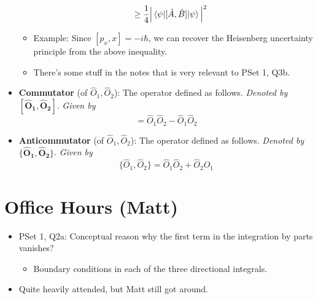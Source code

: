 \documentclass[../notes.tex]{subfiles}
\begin{document}
\begin{itemize}
\begin{itemize}
\begin{align*}
            &\geq \frac{1}{4}\Big| \ev{[\hat{A},\hat{B}]}{\psi} \Big|^2
        \end{align*}
        \item Example: Since $[p_x,x]=-i\hbar$, we can recover the Heisenberg uncertainty principle from the above inequality.
        \item There's some stuff in the notes that is very relevant to PSet 1, Q3b.
    \end{itemize}
    \item \textbf{Commutator} (of $\hat{O}_1,\hat{O}_2$): The operator defined as follows. \emph{Denoted by} $\bm{[\hat{O}_1,\hat{O}_2]}$. \emph{Given by}
    \begin{equation*}
        [\hat{O}_1,\hat{O}_2] = \hat{O}_1\hat{O}_2-\hat{O}_1\hat{O}_2
    \end{equation*}
    \item \textbf{Anticommutator} (of $\hat{O}_1,\hat{O}_2$): The operator defined as follows. \emph{Denoted by} $\bm{\{\hat{O}_1,\hat{O}_2\}}$. \emph{Given by}
    \begin{equation*}
        \{\hat{O}_1,\hat{O}_2\} = \hat{O}_1\hat{O}_2+\hat{O}_2\hat{O}_1
    \end{equation*}
\end{itemize}



\section{Office Hours (Matt)}
\begin{itemize}
    \item PSet 1, Q2a: Conceptual reason why the first term in the integration by parts vanishes?
    \begin{itemize}
        \item Boundary conditions in each of the three directional integrals.
    \end{itemize}
    \item Quite heavily attended, but Matt still got around.
\end{itemize}
\end{document}
